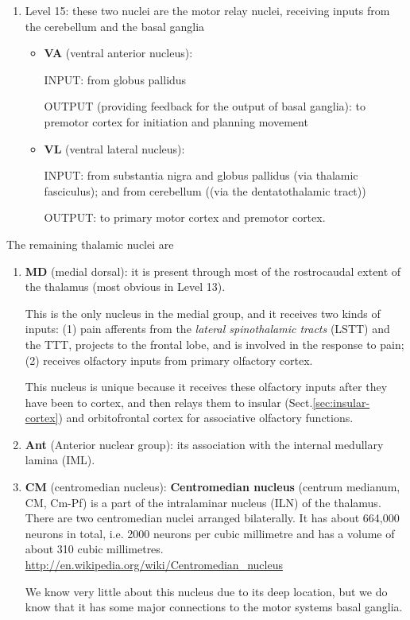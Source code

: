 \begin{enumerate}
  \item Level 15: these two nuclei are the motor relay nuclei,
receiving inputs from the cerebellum and the basal ganglia
 \begin{itemize}
   \item {\bf VA} (ventral anterior nucleus): 
  
    INPUT: from globus pallidus
   
    OUTPUT (providing feedback for the output of basal ganglia): to premotor
    cortex for initiation and planning movement
    
   
   \item {\bf VL} (ventral lateral nucleus):
   
 
   INPUT: from substantia nigra and globus pallidus (via thalamic fasciculus);
   and from cerebellum ((via the dentatothalamic tract))
   
   OUTPUT: to primary motor cortex and premotor cortex.
 \end{itemize} 
\end{enumerate}


The remaining thalamic nuclei are
\begin{enumerate}
  \item {\bf MD} (medial dorsal):  it is present through most of the
  rostrocaudal extent of the thalamus (most obvious in Level 13).

This is the only nucleus in the medial group, and it receives two kinds of
inputs: (1) pain afferents from the {\it lateral spinothalamic tracts} (LSTT)
and the TTT, projects to the frontal lobe, and
is involved in the response to pain; (2)  receives olfactory inputs from primary
olfactory cortex.

This nucleus is unique because it receives these olfactory inputs after they
have been to cortex, and then relays them to insular
(Sect.\ref{sec:insular-cortex}) and orbitofrontal cortex for associative olfactory functions.

  \item {\bf Ant} (Anterior nuclear group):  its association with the internal
medullary lamina (IML).

  \label{sec:centromedial_nucleus}
  \item {\bf CM} (centromedian nucleus): 
  {\bf Centromedian nucleus} (centrum medianum, CM, Cm-Pf) 
is a part of the intralaminar nucleus (ILN) of the thalamus. There are two
centromedian nuclei arranged bilaterally. It has about 664,000 neurons in total,
i.e. 2000 neurons per cubic millimetre and has a volume of about 310 cubic
millimetres.
  \url{http://en.wikipedia.org/wiki/Centromedian_nucleus}

We know very little about this nucleus due to its deep location, but we do
know that it has some major connections to the motor systems basal ganglia.
\end{enumerate}


